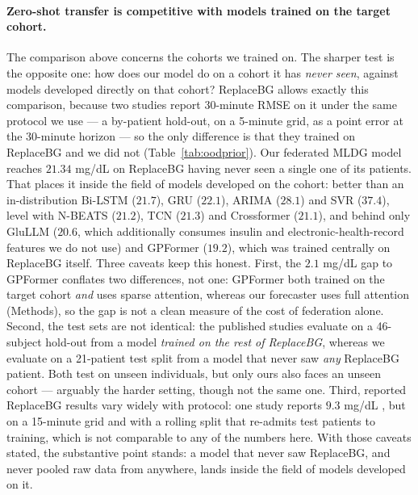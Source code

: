 \documentclass[10pt,letterpaper]{article}
\begin{document}
\paragraph{Zero-shot transfer is competitive with models trained on the target
cohort.} The comparison above concerns the cohorts we trained on. The sharper test
is the opposite one: how does our model do on a cohort it has \emph{never seen},
against models developed directly on that cohort? ReplaceBG allows exactly this
comparison, because two studies report 30-minute RMSE on it under the same
protocol we use --- a by-patient hold-out, on a 5-minute grid, as a point error at
the 30-minute horizon --- so the only difference is that they trained on ReplaceBG
and we did not (Table~\ref{tab:oodprior}). Our federated MLDG model reaches
$21.34$ mg/dL on ReplaceBG having never seen a single one of its patients. That
places it inside the field of models developed on the cohort: better than an
in-distribution Bi-LSTM ($21.7$), GRU ($22.1$), ARIMA ($28.1$) and SVR ($37.4$),
level with N-BEATS ($21.2$), TCN ($21.3$) and Crossformer ($21.1$), and behind
only GluLLM ($20.6$, which additionally consumes insulin and electronic-health-record
features we do not use) and GPFormer ($19.2$), which was trained centrally on
ReplaceBG itself. Three caveats keep this honest. First, the $2.1$ mg/dL gap to
GPFormer conflates two differences, not one: GPFormer both trained on the target
cohort \emph{and} uses sparse attention, whereas our forecaster uses full
attention (Methods), so the gap is not a clean measure of the cost of federation
alone. Second, the test sets are not identical: the published studies evaluate on
a 46-subject hold-out from a model \emph{trained on the rest of ReplaceBG}, whereas
we evaluate on a 21-patient test split from a model that never saw \emph{any}
ReplaceBG patient. Both test on unseen individuals, but only ours also faces an
unseen cohort --- arguably the harder setting, though not the same one. Third, reported ReplaceBG results vary widely with protocol: one study
reports $9.3$ mg/dL \cite{jaloli2023cnnlstm}, but on a 15-minute grid and with a
rolling split that re-admits test patients to training, which is not comparable to
any of the numbers here. With those caveats stated, the substantive point stands:
a model that never saw ReplaceBG, and never pooled raw data from anywhere, lands
inside the field of models developed on it.
\end{document}
